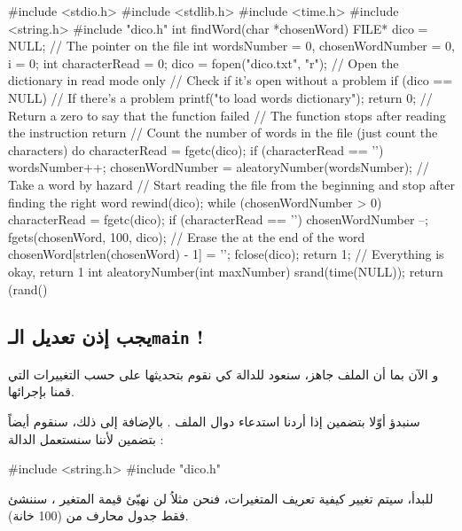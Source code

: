 \begin{Csource}
#include <stdio.h>
#include <stdlib.h>
#include <time.h>
#include <string.h>
#include "dico.h"
int findWord(char *chosenWord)
{
    FILE* dico = NULL; // The pointer on the file
    int wordsNumber = 0, chosenWordNumber = 0, i = 0;
    int characterRead = 0;
    dico = fopen("dico.txt", "r"); // Open the dictionary in read mode only
    // Check if it’s open without a problem
    if (dico == NULL) // If there's a problem
    {
        printf("\nImpossible to load words dictionary");
        return 0; // Return a zero to say that the function failed
        // The function stops after reading the instruction return
    }
    // Count the number of words in the file (just count the \n characters)
    do
    {
        characterRead = fgetc(dico);
        if (characterRead == '\n')
            wordsNumber++;
    }
    chosenWordNumber = aleatoryNumber(wordsNumber); // Take a word by hazard
    // Start reading the file from the beginning and stop after finding the right word
    rewind(dico);
    while (chosenWordNumber > 0)
    {
        characterRead = fgetc(dico);
        if (characterRead == '\n')
            chosenWordNumber --;
    }
    fgets(chosenWord, 100, dico);
    // Erase the \n at the end of the word
    chosenWord[strlen(chosenWord) - 1] = '\0';
    fclose(dico);
     return 1; // Everything is okay, return 1
}
int aleatoryNumber(int maxNumber)
{
    srand(time(NULL));
    return (rand() %
}
\end{Csource}

\subsection{يجب إذن تعديل الـ\texttt{main}
!}

و الآن بما أن الملف
جاهز، سنعود للدالة
كي نقوم بتحديثها على حسب التغييرات التي قمنا بإجرائها.

سنبدؤ أوّلا بتضمين
إذا أردنا استدعاء دوال الملف
.
بالإضافة إلى ذلك، سنقوم أيضاً بتضمين
لأننا سنستعمل الدالة
 :

\begin{Csource}
#include <string.h>
#include "dico.h"
\end{Csource}

للبدأ، سيتم تغيير كيفية تعريف المتغيرات، فنحن مثلاُ لن نهيّئ قيمة المتغير
،
سننشئ فقط جدول محارف من
(100 خانة).


